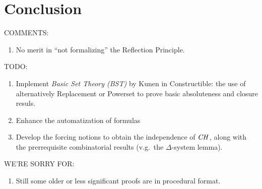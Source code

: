 \section{Conclusion}
\label{sec:conclusion}

COMMENTS:
\begin{enumerate}
\item No merit in ``not formalizing'' the Reflection Principle.
\end{enumerate}

\noindent TODO:
\begin{enumerate}
\item Implement \emph{Basic Set Theory (BST)} by Kunen in
  Constructible: the use of alternatively Replacement or Powerset to
  prove basic absoluteness and closure resuls.
\item Enhance the automatization of formulas
\item Develop the forcing notions to obtain the independence of $\mathit{CH}$,
  along with the prerrequisite combinatorial results (v.g.\ the
  $\Delta$-system lemma).
\end{enumerate}

\noindent WE'RE SORRY FOR:
\begin{enumerate}
\item Still some older or less significant proofs are in procedural
  format.
\end{enumerate}
